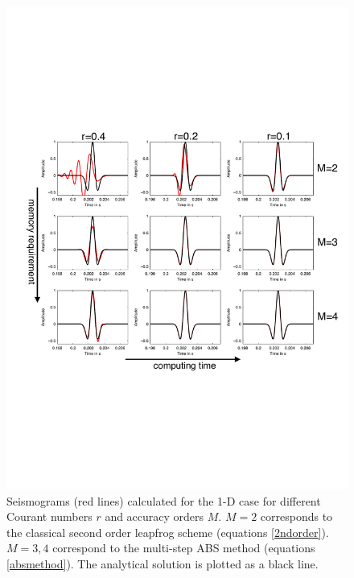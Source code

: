 \documentclass[11pt,onecolumn,oneside]{article}
\begin{document}
\begin{figure}[!h]
\begin{center}
\includegraphics[width=\textwidth]{figures/seismo.pdf}
\caption{Seismograms (red lines) calculated for the 1-D case for different Courant numbers $r$ and accuracy orders $M$. $M=2$ corresponds to the classical second order leapfrog scheme (equations \ref{2ndorder}). $M=3,4$ correspond to the multi-step ABS method (equations \ref{absmethod}). The analytical solution is plotted as a black line. }
\label{fig_1dfdseis}
\end{center}
\end{figure}
\end{document}
